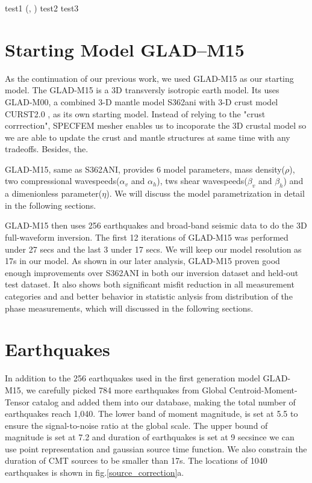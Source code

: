 \documentclass[extra,mreferee]{gji}
\begin{document}
test1 (\cite{zhu2012structure}, \cite{zhu2012structure})
test2 \citep{zhu2015seismic, ekstrom2012global}
test3 \citet{ekstrom2012global}


\section{Starting Model GLAD--M15}

As the continuation of our previous work, we used GLAD-M15 as our
starting model\citep{bozdaug2016global}.
The GLAD-M15 is a 3D transversly isotropic earth model. Its uses
GLAD-M00, a combined 3-D mantle model S362ani \citep{kustowski2008anisotropic}
with 3-D crust model CURST2.0 \citep{bassin2000current}, as its own starting model.
Instead of relying to the "crust corrrection", SPECFEM mesher enables us to incoporate
the 3D crustal model so we are able to update the crust and mantle structures at same
time with any tradeoffs. Besides, the.

GLAD-M15, same as  S362ANI, provides 6 model parameters, mass density($\rho$), two compressional
wavespeeds($\alpha_v$ and $\alpha_h$), tws shear wavespeeds($\beta_v$
and $\beta_h$) and a dimenionless parameter($\eta$). We will discuss
the model parametrization in detail in the following sections.

GLAD-M15 then uses 256 earthquakes and broad-band seismic data to do the 3D full-waveform
inversion\citep{bozdaug2016global}. The first 12 iterations of GLAD-M15 was
performed under 27 secs and the last 3 under 17 secs. We will keep our model
resolution as 17s in our model. As shown in our later analysis,
GLAD-M15 proven good enough improvements over S362ANI in both our inversion
dataset and held-out test dataset. It also shows both significant misfit reduction
in all measurement categories and and better behavior in statistic anlysis from distribution
of the phase measurements, which will discussed in the following sections.

\section{Earthquakes}
In addition to the 256 earthquakes used in the first generation model GLAD-M15, we
carefully picked 784 more earthquakes from Global Centroid-Moment-Tensor catalog\citep{}
and added them into our database, making the total number of earthquakes reach 1,040.
The lower band of moment magnitude, is set at 5.5 to ensure the signal-to-noise ratio at
the global scale. The upper bound of magnitude is set at 7.2 and duration of earthquakes
is set at 9 secsince we can use point representation and gaussian source time function.
We also constrain the duration of CMT sources to be smaller than 17s. The locations of 1040
earthquakes is shown in fig.\ref{source_correction}a.
\end{document}
